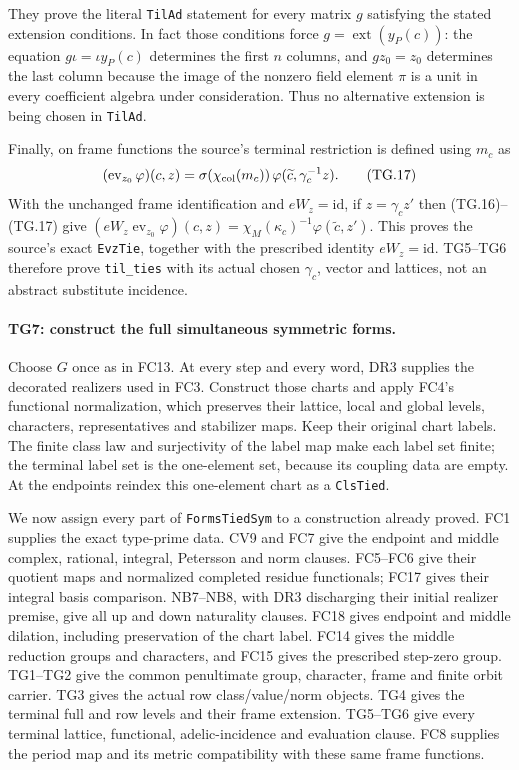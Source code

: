 \documentclass[11pt,a4paper]{article}
\numberwithin{equation}{section}
\theoremstyle{remark}\newtheorem{remark}[theorem]{Remark}
\begin{document}
They prove the literal \texttt{TilAd} statement for every matrix
$g$ satisfying the stated extension conditions. In fact those
conditions force $g=\operatorname{ext}(y_P(c))$: the equation
$g\iota=\iota y_P(c)$ determines the first $n$ columns, and
$g z_0=z_0$ determines the last column because the image of
the nonzero field element $\pi$ is a unit in every coefficient
algebra under consideration. Thus no alternative extension is
being chosen in \texttt{TilAd}.

Finally, on frame functions the source's terminal restriction is
defined using $m_c$ as
\[
 (\operatorname{ev}_{z_0}\varphi)(c,z)
  =\sigma(\chi_{\rm col}(m_c))\,
           \varphi(\widetilde c,\gamma_c^{-1}z).
 \tag{TG.17}
\]
With the unchanged frame identification and $eW_z=\mathrm{id}$,
if $z=\gamma_c z'$ then (TG.16)--(TG.17) give
$(eW_z\operatorname{ev}_{z_0}\varphi)(c,z)
=\chi_M(\kappa_c)^{-1}\varphi(\widetilde c,z')$.
This proves the source's exact \texttt{EvzTie}, together with
the prescribed identity $eW_z=\mathrm{id}$. TG5--TG6 therefore
prove \texttt{til\_\allowbreak ties} with its actual chosen $\gamma_c$,
vector and lattices, not an abstract substitute incidence.

\paragraph{TG7: construct the full simultaneous symmetric forms.}
Choose $G$ once as in FC13. At every step and every word, DR3
supplies the decorated realizers used in FC3. Construct those
charts and apply FC4's functional normalization, which preserves
their lattice, local and global levels, characters, representatives
and stabilizer maps. Keep their original chart labels. The finite
class law and surjectivity of the label map make each label set
finite; the terminal label set is the one-element set, because
its coupling data are empty. At the endpoints reindex this
one-element chart as a \texttt{ClsTied}.

We now assign every part of \texttt{FormsTiedSym} to a construction
already proved. FC1 supplies the exact type-prime data. CV9 and
FC7 give the endpoint and middle complex, rational, integral,
Petersson and norm clauses. FC5--FC6 give their quotient maps
and normalized completed residue functionals; FC17 gives their
integral basis comparison. NB7--NB8, with DR3 discharging their
initial realizer premise, give all up and down naturality clauses.
FC18 gives endpoint and middle dilation, including preservation
of the chart label. FC14 gives the middle reduction groups and
characters, and FC15 gives the prescribed step-zero group.
TG1--TG2 give the common penultimate group, character, frame and
finite orbit carrier. TG3 gives the actual row class/value/norm
objects. TG4 gives the terminal full and row levels and their
frame extension. TG5--TG6 give every terminal lattice, functional,
adelic-incidence and evaluation clause. FC8 supplies the period
map and its metric compatibility with these same frame functions.
\end{document}
